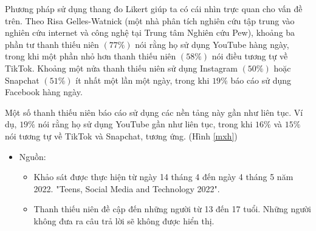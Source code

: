 \documentclass[12pt]{article}
\begin{document}
Phương pháp sử dụng thang đo Likert giúp ta có cái nhìn trực quan cho vấn đề trên. Theo Risa Gelles-Watnick (một nhà phân tích nghiên cứu tập trung vào nghiên cứu internet và công nghệ tại Trung tâm Nghiên cứu Pew), khoảng ba phần tư thanh thiếu niên $(77\%)$ nói rằng họ sử dụng YouTube hàng ngày, trong khi một phần nhỏ hơn thanh thiếu niên $(58\%)$ nói điều tương tự về TikTok. Khoảng một nửa thanh thiếu niên sử dụng Instagram $(50\%)$ hoặc Snapchat $(51\%)$ ít nhất một lần một ngày, trong khi $19\%$ báo cáo sử dụng Facebook hàng ngày.

Một số thanh thiếu niên báo cáo sử dụng các nền tảng này gần như liên tục. Ví dụ, $19\%$ nói rằng họ sử dụng YouTube gần như liên tục, trong khi $16\%$ và $15\%$ nói tương tự về TikTok và Snapchat, tương ứng. (Hình \ref{mxh})

\begin{itemize}
\item Nguồn:
\begin{itemize}
\item Khảo sát được thực hiện từ ngày 14 tháng 4 đến ngày 4 tháng 5 năm 2022.
"Teens, Social Media and Technology 2022".
\item Thanh thiếu niên đề cập đến những người từ 13 đến 17 tuổi. Những người không đưa ra câu trả lời sẽ không được hiển thị.
\end{itemize}
\end{itemize}

\vspace{1cm}
\end{document}
